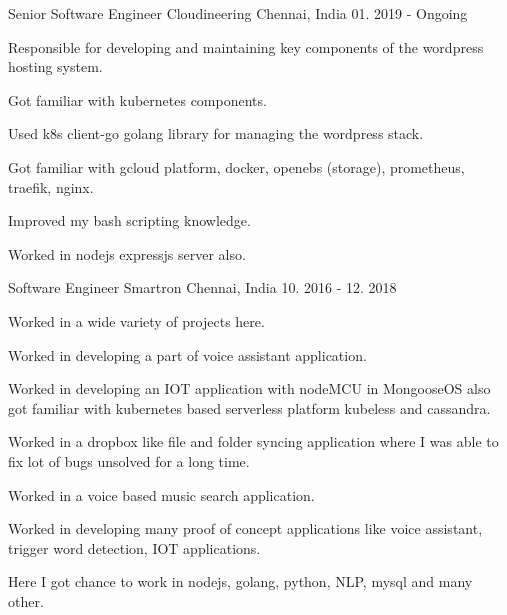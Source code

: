 


\begin{cventries}


\cventry
{Senior Software Engineer} %
{Cloudineering} %
{Chennai, India} %
{01. 2019 - Ongoing} %
{ %
\begin{cvitems}
\item {Responsible for developing and maintaining key components of the wordpress hosting system.}
\item {Got familiar with kubernetes components.}
\item {Used k8s client-go golang library for managing the wordpress stack.}
\item{Got familiar with gcloud platform, docker, openebs (storage), prometheus, traefik, nginx.}
\item{Improved my bash scripting knowledge.}
\item{Worked in nodejs expressjs server also.}
\end{cvitems}
}


\cventry
{Software Engineer} %
{Smartron} %
{Chennai, India} %
{10. 2016 - 12. 2018} %
{ %
\begin{cvitems}
\item {Worked in a wide variety of projects here.}
\item {Worked in developing a part of voice assistant application.}
\item{Worked in developing an IOT application with nodeMCU in MongooseOS also got familiar with kubernetes based serverless
platform kubeless and cassandra.}
\item{Worked in a dropbox like file and folder syncing application where I was able to fix lot of bugs unsolved for a long time.}
\item{Worked in a voice based music search application.}
\item{Worked in developing many proof of concept applications like voice assistant, trigger word detection, IOT applications.}
\item{Here I got chance to work in nodejs, golang, python, NLP, mysql and many other.}
\end{cvitems}
}


\end{cventries}
